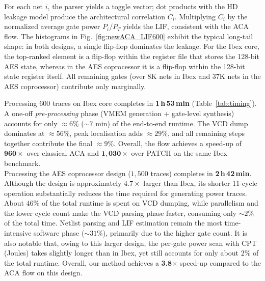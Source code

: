 \documentclass[sigconf]{acmart}
\begin{document}
For each net \(i\), the parser yields a toggle vector; dot products with
the HD leakage model produce the architectural correlation \(C_i\).
Multiplying \(C_i\) by the normalized average gate power
\(P_i/P_T\) yields the LIF, consistent with the ACA flow.
The histograms in Fig.~\ref{fig:newACA_LIF600} exhibit the typical long-tail shape:
in both designs, a single flip-flop dominates the leakage. 
For the Ibex core, the top-ranked element is a flip-flop within the register file that stores the 128-bit AES state,
whereas in the AES coprocessor it is a flip-flop within the 128-bit state register itself.
All remaining gates (over 8K nets in Ibex and 37K nets in the AES coprocessor) contribute only marginally.





Processing \(600\) traces on Ibex core completes in \textbf{1\,h\,53\,min} (Table~\ref{tab:timing}).  
A one-off \emph{pre-processing} phase (VMEM generation + gate-level synthesis) accounts for only \(\approx 6\%\) (\(\sim7\) min) of the end-to-end runtime.  
The VCD dump dominates at \(\approx56\%\), peak localisation adds \(\approx29\%\), and all remaining steps together contribute the final \(\approx9\%\).  
Overall, the flow achieves a speed-up of \(\mathbf{960\times}\) over classical ACA and \(\mathbf{1{,}030\times}\) over PATCH on the same Ibex benchmark. \\
Processing the {AES coprocessor} design (\(1{,}500\) traces) completes in \textbf{2\,h\,42\,min}.  
Although the design is approximately \(4.7\times\) larger than Ibex, its shorter 11-cycle operation substantially reduces the time required for generating power traces.  
About \(46\%\) of the total runtime is spent on VCD dumping, while parallelism and the lower cycle count make the VCD parsing phase faster, consuming only \(\sim2\%\) of the total time.  
Netlist parsing and LIF estimation remain the most time-intensive software phase (\(\sim31\%\)), primarily due to the higher gate count.  
It is also notable that, owing to this larger design, the per-gate power scan with CPT (Joules) takes slightly longer than in Ibex, yet still accounts for only about \(2\%\) of the total runtime.  
Overall, our method achieves a \textbf{3.8$\times$} speed-up compared to the ACA flow on this design. \\
\end{document}
